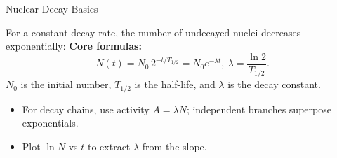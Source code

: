 \begin{KnowledgePoint}{Nuclear Decay Basics \Core}
  \KPFormulas
  \begin{formulabox}
  For a constant decay rate, the number of undecayed nuclei decreases exponentially:
  \textbf{Core formulas:}
  \[
    N(t)=N_0\,2^{-t/T_{1/2}}=N_0 e^{-\lambda t},\ \lambda=\frac{\ln 2}{T_{1/2}}.
  \]
  $N_0$ is the initial number, $T_{1/2}$ is the half-life, and $\lambda$ is the decay constant.
  \end{formulabox}
  \KPHeuristics
  \begin{heuristicsbox}
  \begin{itemize}[leftmargin=*]
    \item For decay chains, use activity $A=\lambda N$; independent branches superpose exponentials.
    \item Plot $\ln N$ vs $t$ to extract $\lambda$ from the slope.
  \end{itemize}
  \end{heuristicsbox}
\end{KnowledgePoint}


